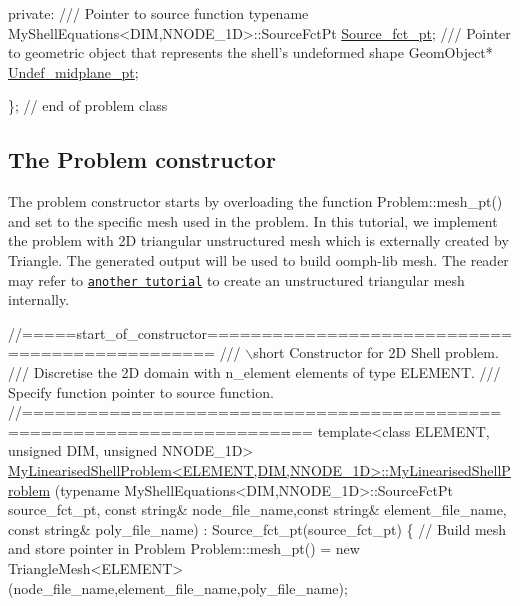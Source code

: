\begin{DoxyCodeInclude}
\textcolor{keyword}{private}:
\textcolor{comment}{}
\textcolor{comment}{ /// Pointer to source function}
\textcolor{comment}{} \textcolor{keyword}{typename} MyShellEquations<DIM,NNODE\_1D>::SourceFctPt \hyperlink{classMyLinearisedShellProblem_a55fd5e4ce59d478cb41bd8457e868dea}{Source\_fct\_pt};\textcolor{comment}{}
\textcolor{comment}{ /// Pointer to geometric object that represents the shell's undeformed shape}
\textcolor{comment}{} GeomObject* \hyperlink{classMyLinearisedShellProblem_a18e84aab4a7fad179e35d381e61c4584}{Undef\_midplane\_pt};

\}; \textcolor{comment}{// end of problem class}

\end{DoxyCodeInclude}




\hypertarget{index_constructor}{}\subsection{The Problem constructor}\label{index_constructor}
The problem constructor starts by overloading the function {\ttfamily Problem\+::mesh\+\_\+pt()} and set to the specific mesh used in the problem. In this tutorial, we implement the problem with 2D triangular unstructured mesh which is externally created by {\ttfamily Triangle}. The generated output will be used to build {\ttfamily oomph-\/lib} mesh. The reader may refer to \href{../../../meshes/mesh_from_inline_triangle/html/index.html}{\tt another tutorial} to create an unstructured triangular mesh internally.

 
\begin{DoxyCodeInclude}
\textcolor{comment}{//=====start\_of\_constructor===============================================}
\textcolor{comment}{/// \(\backslash\)short Constructor for 2D Shell problem.}
\textcolor{comment}{}\textcolor{comment}{/// Discretise the 2D domain with n\_element elements of type ELEMENT.}
\textcolor{comment}{}\textcolor{comment}{/// Specify function pointer to source function. }
\textcolor{comment}{}\textcolor{comment}{//========================================================================}
\textcolor{keyword}{template}<\textcolor{keyword}{class} ELEMENT, \textcolor{keywordtype}{unsigned} DIM, \textcolor{keywordtype}{unsigned} NNODE\_1D>
\hyperlink{classMyLinearisedShellProblem_a2ccc4ed3e631ca68d1d86423ef8eeb03}{MyLinearisedShellProblem<ELEMENT,DIM,NNODE\_1D>::MyLinearisedShellProblem}
(\textcolor{keyword}{typename} MyShellEquations<DIM,NNODE\_1D>::SourceFctPt source\_fct\_pt,
\textcolor{keyword}{const} \textcolor{keywordtype}{string}& node\_file\_name,\textcolor{keyword}{const} \textcolor{keywordtype}{string}& element\_file\_name,
\textcolor{keyword}{const} \textcolor{keywordtype}{string}& poly\_file\_name) : 
 Source\_fct\_pt(source\_fct\_pt)
\{ 
 \textcolor{comment}{// Build mesh and store pointer in Problem}
 Problem::mesh\_pt() = \textcolor{keyword}{new} TriangleMesh<ELEMENT>(node\_file\_name,element\_file\_name,poly\_file\_name);

\end{DoxyCodeInclude}


